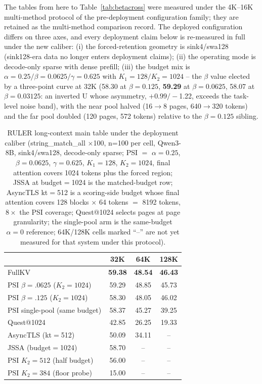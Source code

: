 \documentclass[11pt]{article}
\begin{document}
The tables from here to Table~\ref{tab:betacross} were measured under the 4K--16K multi-method protocol of the pre-deployment configuration family; they are retained as the multi-method comparison record. The deployed configuration differs on three axes, and every deployment claim below is re-measured in full under the new caliber: (i) the forced-retention geometry is sink4/swa128 (sink128-era data no longer enters deployment claims); (ii) the operating mode is decode-only sparse with dense prefill; (iii) the budget mix is $\alpha{=}0.25/\beta{=}0.0625/\gamma{=}0.625$ with $K_1{=}128/K_2{=}1024$ -- the $\beta$ value elected by a three-point curve at 32K (58.30 at $\beta{=}0.125$, \textbf{59.29} at $\beta{=}0.0625$, 58.07 at $\beta{=}0.03125$: an inverted U whose asymmetry, $+0.99/-$1.22, exceeds the task-level noise band), with the near pool halved (16$\to$8 pages, 640$\to$320 tokens) and the far pool doubled (120 pages, 572 tokens) relative to the $\beta{=}0.125$ sibling.

\begin{table}[h]\centering
\caption{RULER long-context main table under the deployment caliber (string\_match\_all $\times$100, n=100 per cell, Qwen3-8B, sink4/swa128, decode-only sparse; PSI $=$ $\alpha{=}0.25$, $\beta{=}0.0625$, $\gamma{=}0.625$, $K_1{=}128$, $K_2{=}1024$, final attention covers 1024 tokens plus the forced region; JSSA at budget$=$1024 is the matched-budget row; AsyncTLS kt$=$512 is a scoring-side budget whose final attention covers 128 blocks $\times$ 64 tokens $=$ 8192 tokens, $8\times$ the PSI coverage; Quest@1024 selects pages at page granularity; the single-pool arm is the same-budget $\alpha{=}0$ reference; 64K/128K cells marked ``--'' are not yet measured for that system under this protocol).}
\label{tab:rulerlong}
\begin{tabular}{lccc}
\toprule
 & 32K & 64K & 128K \\
\midrule
FullKV & \textbf{59.38} & \textbf{48.54} & \textbf{46.43} \\
PSI $\beta{=}.0625$ ($K_2{=}1024$) & 59.29 & 48.85 & 45.73 \\
PSI $\beta{=}.125$ ($K_2{=}1024$) & 58.30 & 48.05 & 46.02 \\
PSI single-pool (same budget) & 58.37 & 45.27 & 39.25 \\
\addlinespace
Quest@1024 & 42.85 & 26.25 & 19.33 \\
AsyncTLS (kt$=$512) & 50.09 & 34.11 & -- \\
JSSA (budget$=$1024) & 58.70 & -- & -- \\
\addlinespace
PSI $K_2{=}512$ (half budget) & 56.00 & -- & -- \\
PSI $K_2{=}384$ (floor probe) & 15.00 & -- & -- \\
\bottomrule
\end{tabular}
\end{table}
\end{document}
